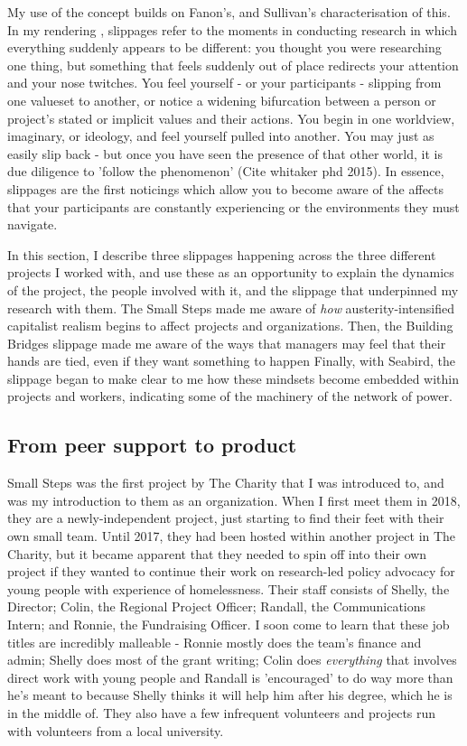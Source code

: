 My use of the concept builds on Fanon's, and Sullivan's characterisation of this. In my rendering \citep{cutting_making_2021}, slippages refer to the moments in conducting research in which everything suddenly appears to be different: you thought you were researching one thing, but something that feels suddenly out of place redirects your attention and your nose twitches. You feel yourself - or your participants - slipping from one valueset to another, or notice a widening bifurcation between a person or project's stated or implicit values and their actions. You begin in one worldview, imaginary, or ideology, and feel yourself pulled into another. You may just as easily slip back - but once you have seen the presence of that other world, it is due diligence to 'follow the phenomenon' (Cite whitaker phd 2015). In essence, slippages are the first noticings which allow you to become aware of the affects that your participants are constantly experiencing or the environments they must navigate.

In this section, I describe three slippages happening across the three different projects I worked with, and use these as an opportunity to explain the dynamics of the project, the people involved with it, and the slippage that underpinned my research with them. The Small Steps made me aware of \textit{how} austerity-intensified capitalist realism begins to affect projects and organizations. Then, the Building Bridges slippage made me aware of the ways that  managers may feel that their hands are tied, even if they want something to happen Finally, with Seabird, the slippage began to make clear to me how these mindsets  become embedded within projects and workers, indicating some of the machinery of the network of power. 

\subsection{From peer support to product}
Small Steps was the first project by The Charity that I was introduced to, and was my introduction to them as an organization. When I first meet them in 2018, they are a newly-independent project, just starting to find their feet with their own small team. Until 2017, they had been hosted within another project in The Charity, but it became apparent that they needed to spin off into their own project if they wanted to continue their work on research-led policy advocacy for young people with experience of homelessness. Their staff consists of Shelly, the Director; Colin, the Regional Project Officer; Randall, the Communications Intern; and Ronnie, the Fundraising Officer. I soon come to learn that these job titles are incredibly malleable - Ronnie mostly does the team's finance and admin; Shelly does most of the grant writing; Colin does \textit{everything} that involves direct work with young people and Randall is 'encouraged' to do way more than he's meant to because Shelly thinks it will help him after his degree, which he is in the middle of. They also have a few infrequent volunteers and projects run with volunteers from a local university. 

